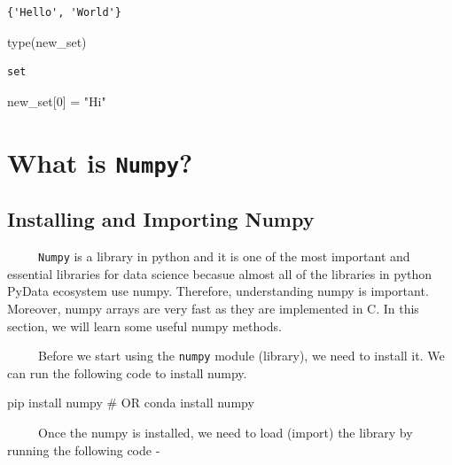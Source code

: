 \documentclass[
  letterpaper,
  DIV=11,
  numbers=noendperiod]{scrreprt}
\newenvironment{Shaded}{\begin{snugshade}}{\end{snugshade}}
\newcommand{\BuiltInTok}[1]{\textcolor[rgb]{0.00,0.23,0.31}{#1}}
\newcommand{\CommentTok}[1]{\textcolor[rgb]{0.37,0.37,0.37}{#1}}
\newcommand{\DecValTok}[1]{\textcolor[rgb]{0.68,0.00,0.00}{#1}}
\newcommand{\NormalTok}[1]{\textcolor[rgb]{0.00,0.23,0.31}{#1}}
\newcommand{\OperatorTok}[1]{\textcolor[rgb]{0.37,0.37,0.37}{#1}}
\newcommand{\StringTok}[1]{\textcolor[rgb]{0.13,0.47,0.30}{#1}}
\begin{document}
\begin{verbatim}
{'Hello', 'World'}
\end{verbatim}

\begin{Shaded}
\begin{Highlighting}[]
\BuiltInTok{type}\NormalTok{(new\_set)}
\end{Highlighting}
\end{Shaded}

\begin{verbatim}
set
\end{verbatim}

\begin{Shaded}
\begin{Highlighting}[]
\NormalTok{new\_set[}\DecValTok{0}\NormalTok{] }\OperatorTok{=} \StringTok{"Hi"}
\end{Highlighting}
\end{Shaded}

\section{\texorpdfstring{What is
\texttt{Numpy}?}{What is Numpy?}}\label{what-is-numpy}

\subsection{Installing and Importing
Numpy}\label{installing-and-importing-numpy}

~~~~~\texttt{Numpy} is a library in python and it is one of the most
important and essential libraries for data science becasue almost all of
the libraries in python PyData ecosystem use numpy. Therefore,
understanding numpy is important. Moreover, numpy arrays are very fast
as they are implemented in C. In this section, we will learn some useful
numpy methods.

~~~~~Before we start using the \texttt{numpy} module (library), we need
to install it. We can run the following code to install numpy.

\begin{Shaded}
\begin{Highlighting}[]
\NormalTok{pip install numpy }
\CommentTok{\# OR}
\NormalTok{conda install numpy }
\end{Highlighting}
\end{Shaded}

~~~~~Once the numpy is installed, we need to load (import) the library
by running the following code -
\end{document}
